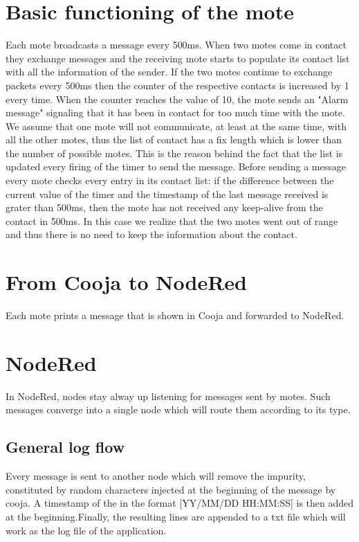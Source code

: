 \documentclass[12pt]{article}
\begin{document}
\section{Basic functioning of the mote}
Each mote broadcasts a message every 500ms.\newline
When two motes come in contact they exchange messages and the receiving mote starts to populate its contact list with all the information of the sender.\newline
If the two motes continue to exchange packets every 500ms then the counter of the respective contacts is increased by 1 every time. When the counter reaches the value of 10, the mote sends an "Alarm message" signaling that it has been in contact for too much time with the mote.\newline
We assume that one mote will not communicate, at least at the same time, with all the other motes, thus the list of contact has a fix length which is lower than the number  of possible motes.
This is the reason behind the fact that the list is updated every firing of the timer to send the message.\newline
Before sending a message every mote checks every entry in its contact list: if the difference between the current value of the timer and the timestamp of the last message received is grater than 500ms, then the mote has not received any keep-alive from the contact in 500ms. In this case we realize that the two motes went out of range and thus there is no need to keep the information about the contact.


\section{From Cooja to NodeRed}
Each mote prints a message that is shown in Cooja and forwarded to NodeRed.

\section{NodeRed}

In NodeRed, nodes stay alway up listening for messages sent by motes. Such messages converge into a single node which will route them according to its type.

\subsection{General log flow}
Every message is sent to another node which will remove the impurity, constituted by random characters injected at the beginning of the message by cooja. A timestamp of the in the format [YY/MM/DD HH:MM:SS] is then added at the beginning.Finally, the resulting lines are appended to a txt file which will work as the log file of the application.
\end{document}
